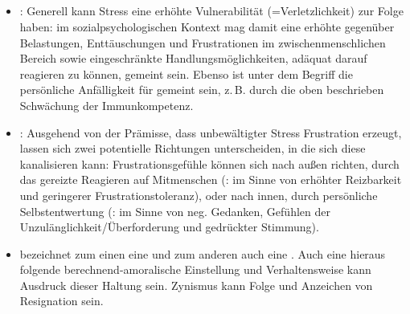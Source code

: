 \subsection{}
\label{topic:beanspruchungsfolgen-psi}

\Text
{{\TxBeschreibung}}%
{%
\begin{itemize}
  \item {}:
Generell kann Stress eine erhöhte Vulnerabilität
(=Verletzlichkeit) zur Folge haben: im sozialpsychologischen
Kontext mag damit eine erhöhte  gegenüber Belastungen, Enttäuschungen und
Frustrationen im zwischenmenschlichen Bereich sowie
eingeschränkte Handlungsmöglichkeiten, adäquat darauf
reagieren zu können, gemeint sein. Ebenso ist unter dem
Begriff die persönliche Anfälligkeit für  gemeint sein, z.\,B. durch die oben
beschrieben Schwächung der Immunkompetenz.
\item 
{}:
Ausgehend von der Prämisse, dass unbewältigter Stress
Frustration erzeugt, lassen sich zwei potentielle Richtungen
unterscheiden, in die sich diese kanalisieren kann:
Frustrationsgefühle können sich nach außen richten, durch
das gereizte Reagieren auf Mitmenschen (: im
Sinne von erhöhter Reizbarkeit und geringerer
Frustrationstoleranz), oder nach innen, durch persönliche
Selbstentwertung (: im Sinne von neg.
Gedanken, Gefühlen der Unzulänglichkeit/Überforderung und
gedrückter Stimmung).

\item 
{} bezeichnet zum einen eine
 und
zum anderen auch eine . Auch eine hieraus
folgende berechnend-amoralische Einstellung und
Verhaltensweise kann Ausdruck dieser Haltung sein. Zynismus
kann Folge und Anzeichen von Resignation sein. 


\end{itemize}}
